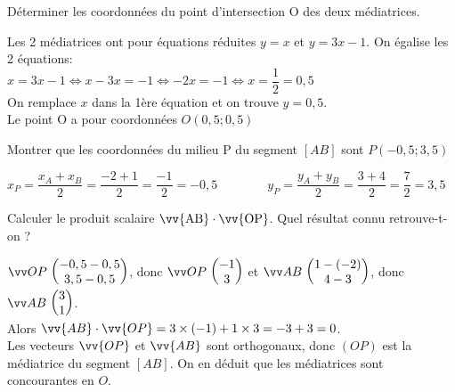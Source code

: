 \documentclass[12pt,a4paper]{article}  %
\begin{document}
\begin{enumMet}
    \item Déterminer les coordonnées du point d'intersection $\mathrm{O}$ des deux médiatrices.\\
    \begin{corrBox}
       Les 2 médiatrices ont pour équations réduites $y=x$ et $y=3x-1$. On égalise les 2 équations:\\
       $x=3x-1\iff x-3x=-1\iff -2x=-1\iff x=\dfrac{1}{2}=0,5$\\
       On remplace $x$ dans la 1ère équation et on trouve $y=0,5$.\\
       Le point O a pour coordonnées $O(0,5;0,5)$
    \end{corrBox}
    \item Montrer que les coordonnées du milieu P du segment $[AB]$ sont $P(-0,5;3,5)$\\
    \begin{corrBox}
        $x_P=\dfrac{x_A+x_B}{2}=\dfrac{-2+1}{2}=\dfrac{-1}{2}=-0,5\quad \quad \quad \quad y_P=\dfrac{y_A+y_B}{2}=\dfrac{3+4}{2}=\dfrac{7}{2}=3,5$
    \end{corrBox}
    \item Calculer le produit scalaire $\vv{\mathrm{AB}} \cdot \vv{\mathrm{OP}}$. Quel résultat connu retrouve-t-on ?\\
    \begin{corrBox}
        $\Coord{OP}{-0,5-0,5}{3,5-0,5}$, donc $\Coord{OP}{-1}{3}$ et $\Coord{AB}{1-(-2)}{4-3}$, donc $\Coord{AB}{3}{1}$.\\
        Alors $\vv{A B} \cdot \vv{OP}=3 \times (-1)+1 \times3=-3+3=0$.\\
        Les vecteurs $\vv{OP}$ et $\vv{AB}$ sont orthogonaux, donc $(OP)$ est la médiatrice du segment $[AB]$. On en déduit que les médiatrices sont concourantes en $O$.
    \end{corrBox}

\end{enumMet}
\end{document}
